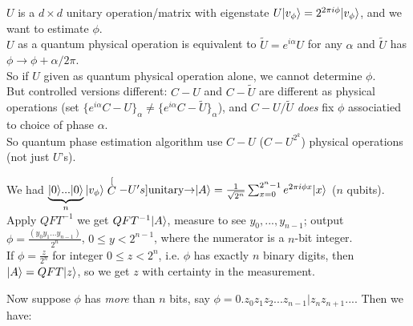 \documentclass[a4paper]{article}
\begin{document}
$U$ is a $d \times d$ unitary operation/matrix with eigenstate $U|v_\phi \rangle = 2^{2\pi i\phi} | v_\phi \rangle$, and we want to estimate $\phi$.\\
$U$ as a quantum physical operation is equivalent to $\tilde{U} = e^{i \alpha} U$ for any $\alpha$ and $\tilde{U}$ has $\phi \to \phi+\alpha/2\pi$.\\
So if $U$ given as quantum physical operation alone, we cannot determine $\phi$.\\
But controlled versions different: $C-U$ and $C-\tilde{U}$ are different as physical operations (set $\{e^{i\alpha} C-U\}_\alpha \neq \{e^{i\alpha} C-\tilde{U}\}_\alpha$), and $C-U/\tilde{U}$ \emph{does} fix $\phi$ associatied to choice of phase $\alpha$.\\
So quantum phase estimation algorithm use $C-U$ ($C-U^{2^k}$) physical operations (not just $U$'s).

We had $\underbrace{|0\rangle...|0\rangle}_{n} |v_\phi\rangle \stackrel[C-U's]{\text{unitary}}{\rightarrow} |A\rangle = \frac{1}{\sqrt{2^n}} \sum_{x=0}^{2^n-1} e^{2\pi i\phi x} |x\rangle$ ($n$ qubits).\\
Apply $QFT^{-1}$ we get $QFT^{-1}|A\rangle$, measure to see $y_0,...,y_{n-1}$; output $\phi = \frac{(y_0y_1...y_{n-1})}{2^n}$, $0 \leq y < 2^{n-1}$, where the numerator is a $n$-bit integer.\\
If $\phi = \frac{z}{2^n}$ for integer $0 \leq z < 2^n$, i.e. $\phi$ has exactly $n$ binary digits, then $|A\rangle = QFT|z\rangle$, so we get $z$ with certainty in the measurement.

Now suppose $\phi$ has \emph{more} than $n$ bits, say $\phi = 0.z_0z_1z_2...z_{n-1} | z_nz_{n+1}...$. Then we have:
\end{document}
